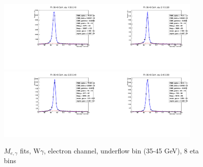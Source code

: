 \begin{figure}[htb]
\begin{center}
   \includegraphics[width=0.45\textwidth]{../figs/figs_v11/ELECTRON_WGamma/EtoGammaFits/sa_hZmass_h_Data_EtoGamma_Enr_ENDCAP_pt35to45_ieta0_noWMtCut.pdf}\includegraphics[width=0.45\textwidth]{../figs/figs_v11/ELECTRON_WGamma/EtoGammaFits/sa_hZmass_h_Data_EtoGamma_Enr_ENDCAP_pt35to45_ieta1_noWMtCut.pdf}\\
   \includegraphics[width=0.45\textwidth]{../figs/figs_v11/ELECTRON_WGamma/EtoGammaFits/sa_hZmass_h_Data_EtoGamma_Enr_ENDCAP_pt35to45_ieta2_noWMtCut.pdf}\includegraphics[width=0.45\textwidth]{../figs/figs_v11/ELECTRON_WGamma/EtoGammaFits/sa_hZmass_h_Data_EtoGamma_Enr_ENDCAP_pt35to45_ieta3_noWMtCut.pdf}\\
  \label{fig:etogFits_35to45}
  \caption{$M_{e,\gamma}$ fits, W$\gamma$, electron channel, underflow bin (35-45 GeV), 8 eta bins}
  \end{center}
\end{figure}


